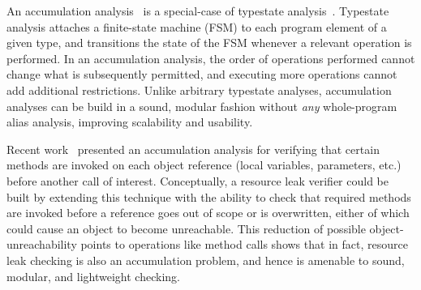 An accumulation analysis~\cite{KelloggRSSE2020}
is a special-case of typestate analysis~\cite{StromY86}.
Typestate analysis attaches a finite-state machine (FSM)
to each program element of a given type, and transitions the state of the
FSM whenever a relevant operation is performed.
In an accumulation analysis,
the order of operations performed cannot change what is subsequently
permitted, and executing more operations cannot add additional
restrictions.  Unlike arbitrary typestate analyses, accumulation analyses can
be build in a sound, modular fashion without \emph{any} whole-program alias
analysis, improving scalability and usability.

Recent work~\cite{KelloggRSSE2020} presented an accumulation analysis for
verifying that certain methods are invoked on each object reference (local
variables, parameters, etc.) before another call of interest.  Conceptually, a
resource leak verifier could be built by extending this technique with the
ability to check that required methods are invoked before a reference goes out
of scope or is overwritten, either of which could cause an object to become unreachable.
This reduction of possible object-unreachability points to operations like
method calls shows that in fact, resource leak checking is also an accumulation
problem, and hence is amenable to sound, modular, and lightweight checking.

